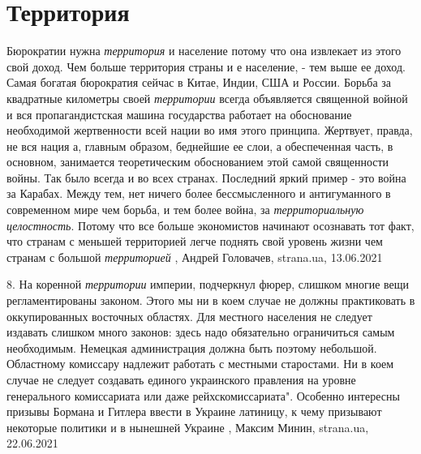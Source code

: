  
 
 
 
 
\chapter{Территория}
\label{sec:slova.territoria}

Бюрократии нужна \emph{территория} и население потому что она извлекает из этого свой
доход. Чем больше территория страны и е население, - тем выше ее доход. Самая
богатая бюрократия сейчас в Китае, Индии, США и России. Борьба за квадратные
километры своей \emph{территории} всегда объявляется священной войной и вся
пропагандистская машина государства работает на обоснование необходимой
жертвенности всей нации во имя этого принципа. Жертвует, правда, не вся нация
а, главным образом, беднейшие ее слои, а обеспеченная часть, в основном,
занимается теоретическим обоснованием этой самой священности войны. Так было
всегда и во всех странах. Последний яркий пример - это война за Карабах.  Между
тем, нет ничего более бессмысленного и антигуманного в современном мире чем
борьба, и тем более война, за \emph{территориальную целостность}. Потому что все
больше экономистов начинают осознавать тот факт, что странам с меньшей
территорией легче поднять свой уровень жизни чем странам с большой \emph{территорией}
, 
Андрей Головачев, strana.ua, 13.06.2021

8. На коренной \emph{территории} империи, подчеркнул фюрер, слишком многие вещи
регламентированы законом. Этого мы ни в коем случае не должны практиковать в
оккупированных восточных областях. Для местного населения не следует издавать
слишком много законов: здесь надо обязательно ограничиться самым необходимым.
Немецкая администрация должна быть поэтому небольшой. Областному комиссару
надлежит работать с местными старостами. Ни в коем случае не следует создавать
единого украинского правления на уровне генерального комиссариата или даже
рейхскомиссариата".
Особенно интересны призывы Бормана и Гитлера ввести в Украине латиницу, к чему
призывают некоторые политики и в нынешней Украине
  , Максим Минин, strana.ua, 22.06.2021

